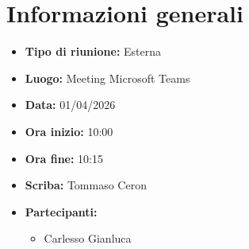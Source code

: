 \section{Informazioni generali}

\begin{itemize} 
    \item \textbf{Tipo di riunione:} Esterna
    \item \textbf{Luogo:} Meeting Microsoft Teams 
    \item \textbf{Data:} 01/04/2026
    \item \textbf{Ora inizio:} 10:00
    \item \textbf{Ora fine:} 10:15
    \item \textbf{Scriba:} Tommaso Ceron 
    \item \textbf{Partecipanti:}
    \begin{itemize}[itemsep=0pt, parsep=1pt, label=--]
        \item Carlesso Gianluca
    \end{itemize}
\end{itemize}